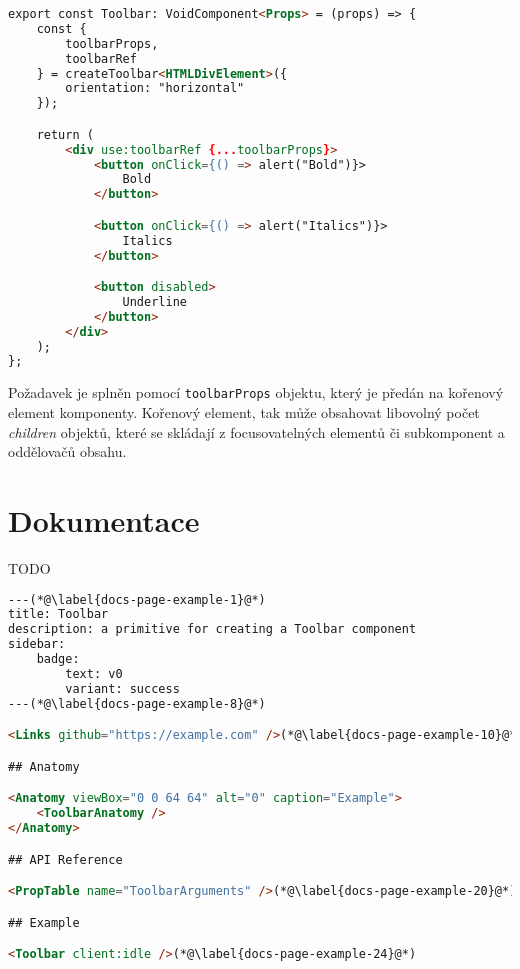 \begin{lstlisting}[caption={Ukázka implementace Toolbar komponenty}, label={toolbar-example}, language=html]
export const Toolbar: VoidComponent<Props> = (props) => {
    const {
        toolbarProps,
        toolbarRef
    } = createToolbar<HTMLDivElement>({
        orientation: "horizontal"
    });

    return (
        <div use:toolbarRef {...toolbarProps}>
            <button onClick={() => alert("Bold")}>
                Bold
            </button>

            <button onClick={() => alert("Italics")}>
                Italics
            </button>

            <button disabled>
                Underline
            </button>
        </div>
    );
};
\end{lstlisting}

Požadavek \hyperref[tfr11]{} je splněn pomocí \texttt{toolbarProps} objektu, který je předán na kořenový element komponenty.
Kořenový element, tak může obsahovat libovolný počet \textit{children} objektů, které se skládají z focusovatelných elementů či subkomponent a oddělovačů obsahu.

\clearpage

\section{Dokumentace}

TODO

\begin{lstlisting}[caption={Ukázka stránky dokumentace psané v MDX}, label={docs-page-example}, language=html]
---(*@\label{docs-page-example-1}@*)
title: Toolbar
description: a primitive for creating a Toolbar component
sidebar:
    badge:
        text: v0
        variant: success
---(*@\label{docs-page-example-8}@*)

<Links github="https://example.com" />(*@\label{docs-page-example-10}@*)

## Anatomy

<Anatomy viewBox="0 0 64 64" alt="0" caption="Example">
    <ToolbarAnatomy />
</Anatomy>

## API Reference

<PropTable name="ToolbarArguments" />(*@\label{docs-page-example-20}@*)

## Example

<Toolbar client:idle />(*@\label{docs-page-example-24}@*)
\end{lstlisting}

